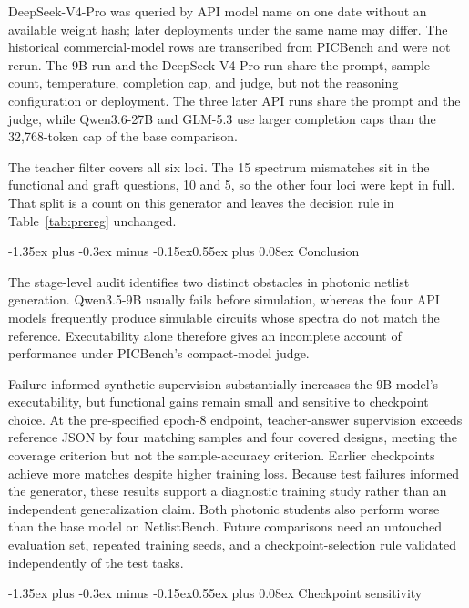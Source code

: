 \documentclass[11pt]{article}
\makeatletter
\renewcommand\section{\@startsection{section}{1}{\z@}%
  {-1.35ex plus -0.3ex minus -0.15ex}{0.55ex plus 0.08ex}%
  {\normalfont\large\bfseries}}
\makeatother
\begin{document}
DeepSeek-V4-Pro was queried by API model name on one date without an available weight hash; later deployments under the same name may differ. The historical commercial-model rows are transcribed from PICBench and were not rerun.
The 9B run and the DeepSeek-V4-Pro run share the prompt, sample count, temperature, completion cap, and judge, but not the reasoning configuration or deployment.
The three later API runs share the prompt and the judge, while Qwen3.6-27B and GLM-5.3 use larger completion caps than the 32{,}768-token cap of the base comparison.

The teacher filter covers all six loci.
The 15 spectrum mismatches sit in the functional and graft questions, 10 and 5, so the other four loci were kept in full.
That split is a count on this generator and leaves the decision rule in Table~\ref{tab:prereg} unchanged.

\section{Conclusion}

The stage-level audit identifies two distinct obstacles in photonic netlist generation. Qwen3.5-9B usually fails before simulation, whereas the four API models frequently produce simulable circuits whose spectra do not match the reference. Executability alone therefore gives an incomplete account of performance under PICBench's compact-model judge.

Failure-informed synthetic supervision substantially increases the 9B model's executability, but functional gains remain small and sensitive to checkpoint choice. At the pre-specified epoch-8 endpoint, teacher-answer supervision exceeds reference JSON by four matching samples and four covered designs, meeting the coverage criterion but not the sample-accuracy criterion. Earlier checkpoints achieve more matches despite higher training loss. Because test failures informed the generator, these results support a diagnostic training study rather than an independent generalization claim. Both photonic students also perform worse than the base model on NetlistBench. Future comparisons need an untouched evaluation set, repeated training seeds, and a checkpoint-selection rule validated independently of the test tasks.




\appendix

\section{Checkpoint sensitivity}
\label{app:checkpoints}
\end{document}
